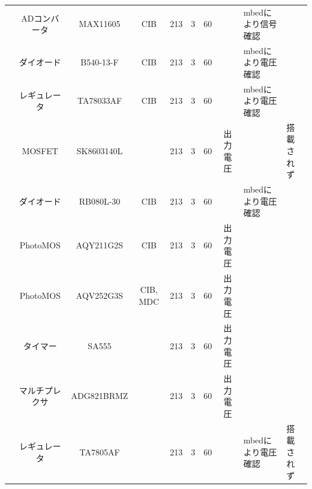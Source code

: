 \begin{landscape}
\begin{table}[htbp]
\begin{tabular}{c|c|c|c|c|c|c|c|l|l}
		& ADコンバータ              & MAX11605             & CIB                  & 213                  & 3                    & 60                   &                      & mbedにより信号確認          &                       \\
		& ダイオード                & B540-13-F            & CIB                  & 213                  & 3                    & 60                   &                      & mbedにより電圧確認          &                       \\
		& レギュレータ               & TA78033AF            & CIB                  & 213                  & 3                    & 60                   &                      & mbedにより電圧確認          &                       \\
		& MOSFET               & SK8603140L           &                      & 213                  & 3                    & 60                   & 出力電圧                 &                      & 搭載されず                 \\
		& ダイオード                & RB080L-30            & CIB                  & 213                  & 3                    & 60                   &                      & mbedにより電圧確認          &                       \\
		& PhotoMOS             & AQY211G2S            & CIB                  & 213                  & 3                    & 60                   & 出力電圧                 &                      &                       \\
		& PhotoMOS             & AQV252G3S            & CIB, MDC             & 213                  & 3                    & 60                   & 出力電圧                 &                      &                       \\
		& タイマー                 & SA555                &                      & 213                  & 3                    & 60                   & 出力電圧                 &                      &                       \\
		& マルチプレクサ              & ADG821BRMZ           &                      & 213                  & 3                    & 60                   & 出力電圧                 &                      &                       \\
		& レギュレータ               & TA7805AF             &                      & 213                  & 3                    & 60                   &                      & mbedにより電圧確認          & 搭載されず                 \\

\end{tabular}
\end{table}
\end{landscape}
